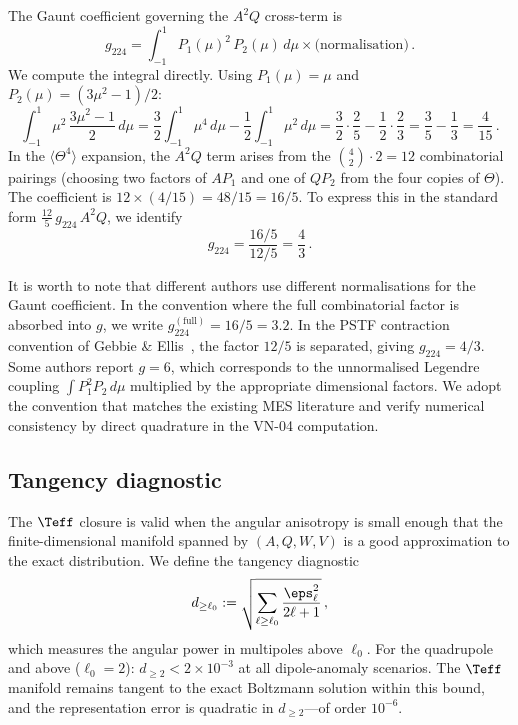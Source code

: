 The Gaunt coefficient governing the $A^2 Q$ cross-term is
\begin{equation}\label{eq:gaunt-def}
g_{224} = \int_{-1}^{1} P_1(\mu)^2\,P_2(\mu)\,d\mu
\times \text{(normalisation)}\,.
\end{equation}
We compute the integral directly.  Using $P_1(\mu) = \mu$ and
$P_2(\mu) = (3\mu^2 - 1)/2$:
\begin{equation}
\int_{-1}^{1} \mu^2\,\frac{3\mu^2 - 1}{2}\,d\mu
= \frac{3}{2}\int_{-1}^{1}\mu^4\,d\mu
  - \frac{1}{2}\int_{-1}^{1}\mu^2\,d\mu
= \frac{3}{2}\cdot\frac{2}{5}
  - \frac{1}{2}\cdot\frac{2}{3}
= \frac{3}{5} - \frac{1}{3}
= \frac{4}{15}\,.
\end{equation}
In the $\langle\Theta^4\rangle$ expansion, the $A^2 Q$
term arises from the $\binom{4}{2}\cdot 2 = 12$ combinatorial
pairings (choosing two factors of $A P_1$ and one of $Q P_2$
from the four copies of $\Theta$).  The coefficient is
$12 \times (4/15) = 48/15 = 16/5$.  To express this in the
standard form $\frac{12}{5}\,g_{224}\,A^2 Q$, we identify
\begin{equation}\label{eq:g224-value}
g_{224} = \frac{16/5}{12/5} = \frac{4}{3}\,.
\end{equation}

It is worth to note that different authors use different
normalisations for the Gaunt coefficient.  In the convention
where the full combinatorial factor is absorbed into $g$, we
write $g_{224}^{(\mathrm{full})} = 16/5 = 3.2$.  In the PSTF
contraction convention of Gebbie \&
Ellis~\cite{MaartensGE1999}, the factor $12/5$ is separated,
giving $g_{224} = 4/3$.  Some authors report $g = 6$, which
corresponds to the unnormalised Legendre coupling
$\int P_1^2 P_2\,d\mu$ multiplied by the appropriate
dimensional factors.  We adopt the convention that matches the
existing MES literature and verify numerical consistency by
direct quadrature in the VN-04 computation.


\subsection{Tangency diagnostic}\label{sec:tangency}

The $\Teff$ closure is valid when the angular anisotropy is
small enough that the finite-dimensional manifold spanned by
$(A, Q, W, V)$ is a good approximation to the exact
distribution.  We define the tangency diagnostic
\begin{equation}\label{eq:tangency}
d_{\geq \ell_0}
:= \sqrt{\sum_{\ell \geq \ell_0}
  \frac{\eps_\ell^2}{2\ell+1}}\,,
\end{equation}
which measures the angular power in multipoles above
$\ell_0$.  For the quadrupole and above ($\ell_0 = 2$):
$d_{\geq 2} < 2 \times 10^{-3}$ at all dipole-anomaly
scenarios.  The $\Teff$ manifold remains tangent to the exact
Boltzmann solution within this bound, and the representation
error is quadratic in $d_{\geq 2}$---of order $10^{-6}$.


